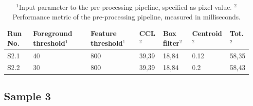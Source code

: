 \documentclass[12pt]{report}
\begin{document}
\begin{table}[!h]
    \centering
    \begin{tabular}{|p{0.8cm}|p{2.5cm}|p{2cm}||p{1.25cm}|p{1.25cm}|p{1.8cm}|p{1cm}|}
        \hline
        \textbf{Run No.}&\textbf{Foreground threshold$^{1}$}&\textbf{Feature threshold$^{1}$}&\textbf{CCL$^{2}$}&\textbf{Box filter$^{2}$}&\textbf{Centroid$^{2}$}&\textbf{Tot.$^{2}$}\\
        \hline
        \hline
        S2.1&40&800&39,39&18,84&0.12&58,35\\
        \hline
        S2.2&30&800&39,39&18,84&0.2&58,43\\
        \hline
    \end{tabular}
    \caption{$^{1}$Input parameter to the pre-processing pipeline, specified as pixel value. $^{2}$Performance metric of the pre-processing pipeline, measured in milliseconds. }
    \label{table:s1_res}
\end{table}

\subsection*{Sample 3}
\end{document}
